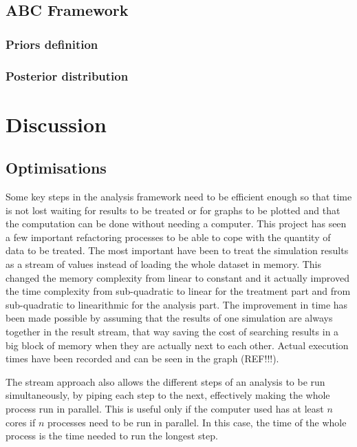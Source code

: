 \documentclass[a4paper,12pt]{report}
\begin{document}
\section{ABC Framework}

\subsection{Priors definition}


\subsection{Posterior distribution}




\chapter{Discussion}
\section{Optimisations}
Some key steps in the analysis framework need to be efficient enough so that time is not lost waiting for results to be treated or for graphs to be plotted and that the computation can be done without needing a computer.
This project has seen a few important refactoring processes to be able to cope with the quantity of data to be treated. The most important have been to treat the simulation results as a stream of values instead of loading the whole dataset in memory. This changed the memory complexity from linear to constant and it actually improved the time complexity from sub-quadratic to linear for the treatment part and from sub-quadratic to linearithmic for the analysis part. The improvement in time has been made possible by assuming that the results of one simulation are always together in the result stream, that way saving the cost of searching results in a big block of memory when they are actually next to each other.
Actual execution times have been recorded and can be seen in the graph (REF!!!).\

The stream approach also allows the different steps of an analysis to be run simultaneously, by piping each step to the next, effectively making the whole process run in parallel. This is useful only if the computer used has at least $n$ cores if $n$ processes need to be run in parallel. In this case, the time of the whole process is the time needed to run the longest step.
\end{document}
